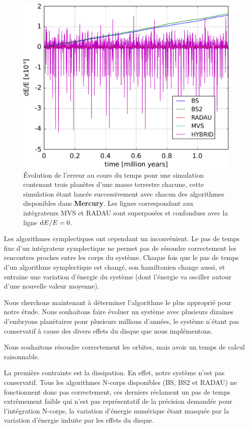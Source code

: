 \begin{figure}[htbp]
\centering
\includegraphics[width=0.65\linewidth]{figure/energy_error.pdf}
\caption[Pour une même simulation, erreur au cours du temps pour BS, BS2, RADAU, MVS et HYBRID.]{Évolution de l'erreur au cours
du temps pour une simulation contenant trois planètes d'une masse terrestre chacune, cette simulation étant lancée
successivement avec chacun des algorithmes disponibles dans \textbf{Mercury}. Les lignes correspondant 
aux intégrateurs MVS et RADAU sont superposées et confondues avec la ligne $\operatorname{d \!} E/E=0$.}\label{fig:energy_error}
\end{figure}

Les algorithmes symplectiques ont cependant un inconvénient. Le pas de temps fixe d'un intégrateur symplectique ne permet pas de résoudre correctement les rencontres proches entre les corps du système. Chaque fois que le pas de temps d'un algorithme symplectique est changé, son hamiltonien change aussi, et entraine une variation d'énergie du système (dont l'énergie va osciller autour d'une nouvelle valeur moyenne). 

\bigskip

Nous cherchons maintenant à déterminer l'algorithme le plus approprié pour notre étude. Nous souhaitons faire évoluer un système avec plusieurs dizaines d'embryons planétaires pour plusieurs millions d'années, le système n'étant pas conservatif à cause des divers effets du disque que nous implémentons. 

Nous souhaitons résoudre correctement les orbites, mais avoir un temps de calcul raisonnable. 

La première contrainte est la dissipation. En effet, notre système n'est pas conservatif. Tous les algorithmes N-corps disponibles (BS, BS2 et RADAU) ne fonctionnent donc pas correctement, ces derniers réclament un pas de temps extrêmement faible qui n'est pas représentatif de la précision demandée pour l'intégration N-corps, la variation d'énergie numérique étant masquée par la variation d'énergie induite par les effets du disque. 


